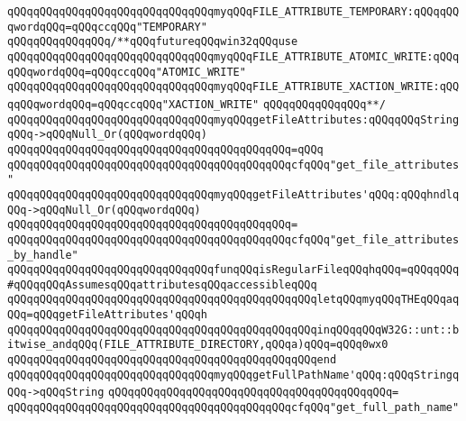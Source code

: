 \verb|qQQqqQQqqQQqqQQqqQQqqQQqqQQqqQQqmyqQQqFILE_ATTRIBUTE_TEMPORARY:qQQqqQQqwordqQQq=qQQqccqQQq"TEMPORARY"|\newline
\verb|qQQqqQQqqQQqqQQq/**qQQqfutureqQQqwin32qQQquse|\newline
\verb|qQQqqQQqqQQqqQQqqQQqqQQqqQQqqQQqmyqQQqFILE_ATTRIBUTE_ATOMIC_WRITE:qQQqqQQqwordqQQq=qQQqccqQQq"ATOMIC_WRITE"|\newline
\verb|qQQqqQQqqQQqqQQqqQQqqQQqqQQqqQQqmyqQQqFILE_ATTRIBUTE_XACTION_WRITE:qQQqqQQqwordqQQq=qQQqccqQQq"XACTION_WRITE"|\newline
\verb|qQQqqQQqqQQqqQQq**/|\newline
\newline
\verb|qQQqqQQqqQQqqQQqqQQqqQQqqQQqqQQqmyqQQqgetFileAttributes:qQQqqQQqStringqQQq->qQQqNull_Or(qQQqwordqQQq)|\newline
\verb|qQQqqQQqqQQqqQQqqQQqqQQqqQQqqQQqqQQqqQQqqQQq=qQQq|\newline
\verb|qQQqqQQqqQQqqQQqqQQqqQQqqQQqqQQqqQQqqQQqqQQqcfqQQq"get_file_attributes"|\newline
\newline
\verb|qQQqqQQqqQQqqQQqqQQqqQQqqQQqqQQqmyqQQqgetFileAttributes'qQQq:qQQqhndlqQQq->qQQqNull_Or(qQQqwordqQQq)|\newline
\verb|qQQqqQQqqQQqqQQqqQQqqQQqqQQqqQQqqQQqqQQqqQQq=|\newline
\verb|qQQqqQQqqQQqqQQqqQQqqQQqqQQqqQQqqQQqqQQqqQQqcfqQQq"get_file_attributes_by_handle"|\newline
\newline
\verb|qQQqqQQqqQQqqQQqqQQqqQQqqQQqqQQqfunqQQqisRegularFileqQQqhqQQq=qQQqqQQq#qQQqqQQqAssumesqQQqattributesqQQqaccessibleqQQq|\newline
\verb|qQQqqQQqqQQqqQQqqQQqqQQqqQQqqQQqqQQqqQQqqQQqqQQqletqQQqmyqQQqTHEqQQqaqQQq=qQQqgetFileAttributes'qQQqh|\newline
\verb|qQQqqQQqqQQqqQQqqQQqqQQqqQQqqQQqqQQqqQQqqQQqqQQqinqQQqqQQqW32G::unt::bitwise_andqQQq(FILE_ATTRIBUTE_DIRECTORY,qQQqa)qQQq=qQQq0wx0|\newline
\verb|qQQqqQQqqQQqqQQqqQQqqQQqqQQqqQQqqQQqqQQqqQQqqQQqend|\newline
\newline
\verb|qQQqqQQqqQQqqQQqqQQqqQQqqQQqqQQqmyqQQqgetFullPathName'qQQq:qQQqStringqQQq->qQQqString|\newline
\verb|qQQqqQQqqQQqqQQqqQQqqQQqqQQqqQQqqQQqqQQqqQQq=|\newline
\verb|qQQqqQQqqQQqqQQqqQQqqQQqqQQqqQQqqQQqqQQqqQQqcfqQQq"get_full_path_name"|\newline
